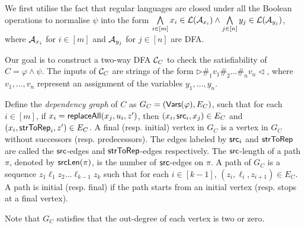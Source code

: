 \documentclass{llncs}
\begin{document}
We first utilise the fact that regular languages are closed under all the Boolean operations to normalise $\psi$ into the form $\bigwedge \limits_{i \in [m]} x_i \in \mathcal{L}(\mathcal{A}_{x_i}) \wedge \bigwedge \limits_{j \in [n]} y_j \in \mathcal{L}(\mathcal{A}_{y_j})$, where $\mathcal{A}_{x_i}$ for $i \in [m]$ and $\mathcal{A}_{y_j}$ for $j \in [n]$ are DFA. 


Our goal is to construct a two-way DFA $\mathcal{C}_C$ to check the satisfiability of $C=\varphi \wedge \psi$. The inputs of $\mathcal{C}_C$ are strings of the form $\triangleright \#_1 v_1 \#_2 \dots \#_n v_n\triangleleft$, where $v_1,\dots, v_n$ represent an assignment of the variables $y_1,\dots,y_n$.


\begin{definition}
Define the \emph{dependency graph} of $C$ as $G_C= (\mathsf{Vars}(\varphi), E_C)$, such that for each $i \in [m]$, if $x_i = \mathsf{replaceAll}(x_j, u_i, z')$, then $(x_i, \mathsf{src}_i, x_j) \in E_C$ and $(x_i, \mathsf{strToRep}_i, z') \in E_C$. A final (resp. initial) vertex in $G_C$ is a vertex in $G_C$ without successors (resp. predecessors). The edges labeled by $\mathsf{src}_i$ and $\mathsf{strToRep}$ are called the $\mathsf{src}$-edges and $\mathsf{strToRep}$-edges respectively. The $\mathsf{src}$-length of a path $\pi$, denoted by $\mathsf{srcLen}(\pi)$, is the number of $\mathsf{src}$-edges on $\pi$. A path of $G_C$ is a sequence $z_1 \ell_1 z_2 \dots \ell_{k-1} z_k$ such that for each $i \in [k-1]$, $(z_i, \ell_i, z_{i+1}) \in E_C$. A path is initial (resp. final) if the path starts from an initial vertex (resp. stops at a final vertex).
\end{definition}
Note that $G_C$ satisfies that the out-degree of each vertex is two or zero. 
\end{document}
